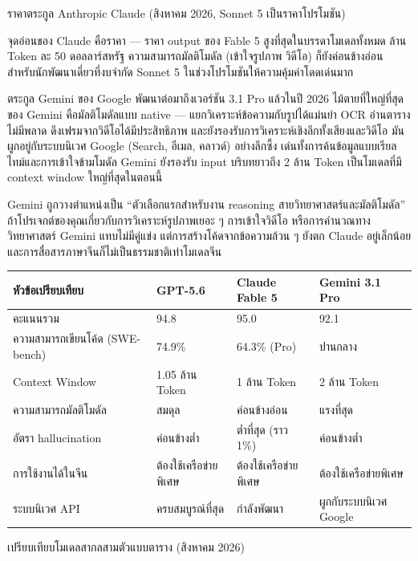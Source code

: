 \begin{center}\small\color{gray}ราคาตระกูล Anthropic Claude (สิงหาคม 2026, Sonnet 5 เป็นราคาโปรโมชัน)\end{center}

จุดอ่อนของ Claude คือราคา — ราคา output ของ Fable 5 สูงที่สุดในบรรดาโมเดลทั้งหมด ล้าน Token ละ 50 ดอลลาร์สหรัฐ ความสามารถมัลติโมดัล (เข้าใจรูปภาพ วิดีโอ) ก็ยังค่อนข้างอ่อน สำหรับนักพัฒนาเดี่ยวที่งบจำกัด Sonnet 5 ในช่วงโปรโมชันให้ความคุ้มค่าโดดเด่นมาก


ตระกูล Gemini ของ Google พัฒนาต่อมาถึงเวอร์ชัน 3.1 Pro แล้วในปี 2026 ไม้ตายที่ใหญ่ที่สุดของ Gemini คือมัลติโมดัลแบบ native — แยกวิเคราะห์ข้อความกับรูปได้แม่นยำ OCR อ่านตารางไม่มีพลาด ดึงเฟรมจากวิดีโอได้มีประสิทธิภาพ และยังรองรับการวิเคราะห์เชิงลึกทั้งเสียงและวิดีโอ มันผูกอยู่กับระบบนิเวศ Google (Search, อีเมล, คลาวด์) อย่างลึกซึ้ง เด่นทั้งการค้นข้อมูลแบบเรียลไทม์และการเข้าใจข้ามโมดัล Gemini ยังรองรับ input บริบทยาวถึง 2 ล้าน Token เป็นโมเดลที่มี context window ใหญ่ที่สุดในตอนนี้

Gemini ถูกวางตำแหน่งเป็น “ตัวเลือกแรกสำหรับงาน reasoning สายวิทยาศาสตร์และมัลติโมดัล” ถ้าโปรเจกต์ของคุณเกี่ยวกับการวิเคราะห์รูปภาพเยอะ ๆ การเข้าใจวิดีโอ หรือการคำนวณทางวิทยาศาสตร์ Gemini แทบไม่มีคู่แข่ง แต่การสร้างโค้ดจากข้อความล้วน ๆ ยังตก Claude อยู่เล็กน้อย และการสื่อสารภาษาจีนก็ไม่เป็นธรรมชาติเท่าโมเดลจีน

\begin{center}
\begin{tabularx}{\linewidth}{|X|X|X|X|}
\hline
\textbf{หัวข้อเปรียบเทียบ} & \textbf{GPT-5.6} & \textbf{Claude Fable 5} & \textbf{Gemini 3.1 Pro} \tabularnewline
\hline
คะแนนรวม & 94.8 & 95.0 & 92.1 \tabularnewline
ความสามารถเขียนโค้ด (SWE-bench) & 74.9\% & 64.3\% (Pro) & ปานกลาง \tabularnewline
Context Window & 1.05 ล้าน Token & 1 ล้าน Token & 2 ล้าน Token \tabularnewline
ความสามารถมัลติโมดัล & สมดุล & ค่อนข้างอ่อน & แรงที่สุด \tabularnewline
อัตรา hallucination & ค่อนข้างต่ำ & ต่ำที่สุด (ราว 1\%) & ค่อนข้างต่ำ \tabularnewline
การใช้งานได้ในจีน & ต้องใช้เครือข่ายพิเศษ & ต้องใช้เครือข่ายพิเศษ & ต้องใช้เครือข่ายพิเศษ \tabularnewline
ระบบนิเวศ API & ครบสมบูรณ์ที่สุด & กำลังพัฒนา & ผูกกับระบบนิเวศ Google \tabularnewline
\hline
\end{tabularx}
\end{center}

\begin{center}\small\color{gray}เปรียบเทียบโมเดลสากลสามตัวแบบตาราง (สิงหาคม 2026)\end{center}

